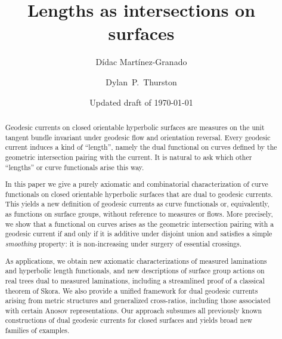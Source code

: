 \documentclass[11pt]{amsart}
\numberwithin{equation}{section}
\numberwithin{figure}{section}
\theoremstyle{definition}
\theoremstyle{plain}
\begin{document}
\title{Lengths as intersections on surfaces} 
\author[Martínez-Granado]{Dídac Martínez-Granado}
\address{Department of Mathematics\\University of Luxembourg\\Av. de la Fonte 6, Esch-sur-Alzette, L-4364, Luxembourg}       

\author[Thurston]{Dylan~P.~Thurston}
\address{Department of Mathematics\\
  Boston College\\
  Chestnut Hill, Mass.\ 02467-3806\\
  USA}
\date{Updated draft of \today}
\begin{abstract}
Geodesic currents on closed orientable hyperbolic surfaces are measures on the
unit tangent bundle invariant
under geodesic flow and orientation reversal.
Every geodesic current induces a kind of ``length'', namely the dual
functional on
curves defined by the
geometric intersection pairing with the current. It is natural to ask
which other ``lengths'' or curve
functionals arise this way.

In this paper we give a purely axiomatic and combinatorial
characterization of curve functionals on closed orientable hyperbolic
surfaces that are dual to
geodesic currents. This
yields a new definition of geodesic currents as curve functionals or,
equivalently, as functions on surface groups, without reference to
measures or flows. More precisely, we show that a functional on curves
arises as the geometric intersection pairing with a geodesic current
if and only if it is additive under disjoint union and satisfies a
simple \emph{smoothing} property: it is non-increasing under
surgery of essential crossings.

As applications, we obtain new axiomatic characterizations of measured
laminations and hyperbolic length functionals, and new descriptions of surface group actions on real trees dual to measured laminations, including a streamlined proof of a
classical theorem of Skora. We also provide a unified framework for
dual geodesic currents arising from metric structures and generalized
cross-ratios, including those associated with certain Anosov
representations. Our approach subsumes all previously
known constructions of dual geodesic currents for closed surfaces and
yields broad new
families of examples.
\end{abstract}
\maketitle












\appendix







\end{document}
